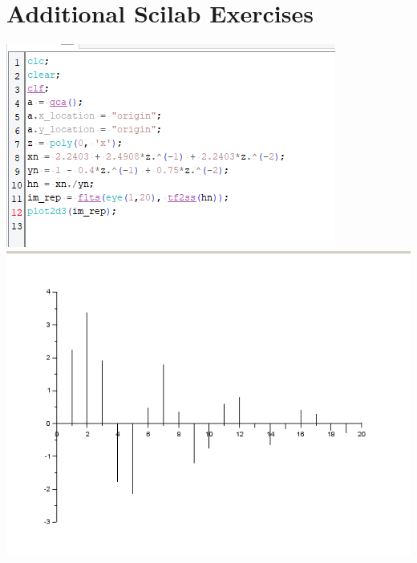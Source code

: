 \documentclass[13pt,a4paper]{article}
\begin{document}
	\section{Additional Scilab Exercises}
	\includegraphics{code.png}	\\
	\includegraphics{graph.png}
	
\end{document}
